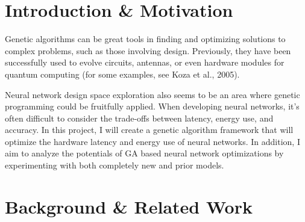 \documentclass[sigconf]{acmart}
\begin{document}


\fi
\maketitle

\section{Introduction \& Motivation}

Genetic algorithms can be great tools in finding and optimizing solutions to complex problems, 
such as those involving design. Previously, they have been successfully used to evolve circuits, 
antennas, or even hardware modules for quantum computing (for some examples, see Koza et al., 2005). 

Neural network design space exploration also seems to be an area where genetic programming could be fruitfully applied. 
When developing neural networks, it's often difficult to consider the trade-offs between latency, energy use, and accuracy.
In this project, I will create a genetic algorithm framework that will optimize the hardware latency and energy use of neural networks. 
In addition, I aim to analyze the potentials of GA based neural network optimizations by experimenting with both completely new
and prior models.  

\section{Background \& Related Work}
\end{document}
